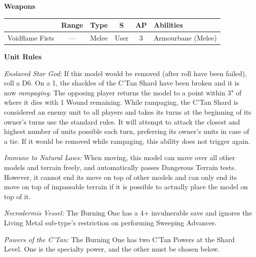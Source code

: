 \begin{minipage}[t]{0.72\textwidth}
	\vspace*{2em}
	\textbf{Weapons}
	
	\begin{tabular}{m{95 pt} *{4}{c} >{\raggedright\arraybackslash}p{130pt}}
		& Range & Type & S & AP & Abilities \\
		\hline
		Voidflame Fists & — & Melee & User & 3 & Armourbane (Melee) \\
	\end{tabular}
	
	\vspace*{2em}
	\textbf{Unit Rules}
	
	\textit{Enslaved Star God}: If this model would be removed (after  roll have been failed), roll a D6. On a 1, the shackles of the C'Tan Shard have been broken and it is now \textit{rampaging}. The opposing player returns the model to a point within 3" of where it dies with 1 Wound remaining. While rampaging, the C'Tan Shard is considered an enemy unit to all players and takes its turns at the beginning of its owner's turns use the standard rules. It will attempt to attack the closest and highest number of units possible each turn, preferring its owner's units in case of a tie. If it would be removed while rampaging, this ability does not trigger again.
		
	\textit{Immune to Natural Laws:} When moving, this model can move over all other models and terrain freely, and automatically passes Dangerous Terrain tests. However, it cannot end its move on top of other models and can only end its move on top of impassable terrain if it is possible to actually place the model on top of it.
	
	\textit{Necrodermis Vessel:} The Burning One has a 4+ invulnerable save and ignores the Living Metal sub-type's restriction on performing Sweeping Advances.
	
	\textit{Powers of the C'Tan:} The Burning One has two C'Tan Powers at the Shard Level. One is the  specialty power, and the other must be chosen below.
	

\end{minipage}
